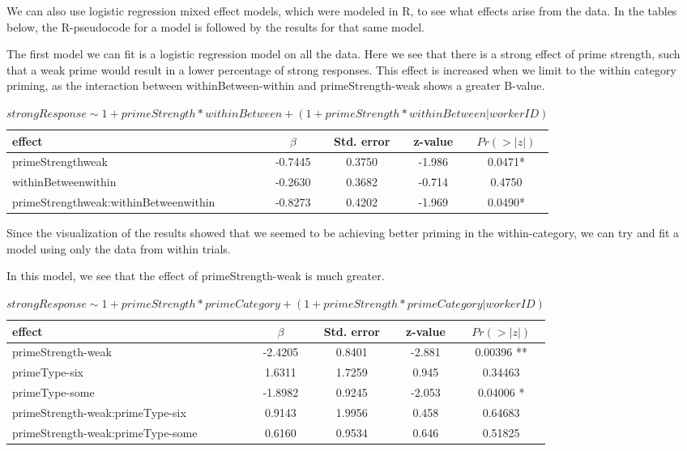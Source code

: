 \documentclass[]{article}
\begin{document}
We can also use logistic regression mixed effect models, which were modeled in R, to see what effects arise from the data. In the tables below, the R-pseudocode for a model is followed by the results for that same model. 
\pagebreak

The first model we can fit is a logistic regression model on all the data. Here we see that there is a strong effect of prime strength, such that a weak prime would result in a lower percentage of strong responses. This effect is increased when we limit to the within category priming, as the interaction between withinBetween-within and primeStrength-weak shows a greater B-value.
\begin{table}[h]
\caption{$strongResponse \sim 1 + primeStrength*withinBetween +(1 + primeStrength*withinBetween | workerID)$}
\begin{center}
\begin{tabularx}{1.1\textwidth}{|X c c c c|}
\hline 
effect & $\beta$ & Std. error & z-value & $Pr(>|z|)$ \\
\hline
primeStrengthweak & -0.7445 & 0.3750 & -1.986 & 0.0471* \\

withinBetweenwithin & -0.2630 & 0.3682 & -0.714 & 0.4750 \\

primeStrengthweak:withinBetweenwithin & -0.8273 & 0.4202 & -1.969 &  0.0490*\\
\hline
\end{tabularx}
\end{center}
\end{table}

Since the visualization of the results showed that we seemed to be achieving better priming in the within-category, we can try and fit a model using only the data from within trials.

In this model, we see that the effect of primeStrength-weak is much greater.
\begin{table}[h]
\caption{$strongResponse \sim 1 + primeStrength*primeCategory +(1 + primeStrength*primeCategory | workerID)$}
\begin{center}
\begin{tabularx}{1.1\textwidth}{|X c c c c|}
\hline 
effect & $\beta$ & Std. error & z-value & $Pr(>|z|)$ \\
\hline
primeStrength-weak &  -2.4205 & 0.8401 & -2.881 & 0.00396 ** \\
primeType-six & 1.6311 & 1.7259 & 0.945 & 0.34463 \\
primeType-some & -1.8982 & 0.9245 & -2.053 & 0.04006 *  \\
primeStrength-weak:primeType-six & 0.9143 & 1.9956 &  0.458 & 0.64683\\
primeStrength-weak:primeType-some & 0.6160 & 0.9534 & 0.646 & 0.51825 \\    

\hline
\end{tabularx}
\end{center}
\end{table}
\end{document}
